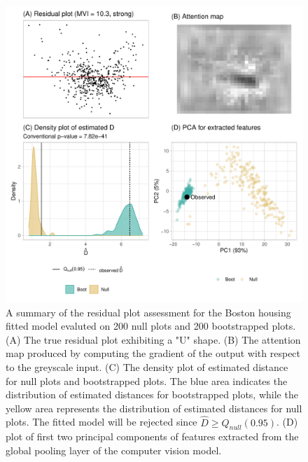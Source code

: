 \documentclass[]{interact}
\theoremstyle{plain}%
\theoremstyle{definition}
\theoremstyle{remark}
\begin{document}
\begin{figure}[!h]

{\centering \includegraphics[width=1\linewidth]{paper_files/figure-latex/boston-check-1} 

}

\caption{A summary of the residual plot assessment for the Boston housing fitted model evaluted on 200 null plots and 200 bootstrapped plots. (A) The true residual plot exhibiting a "U" shape. (B) The attention map produced by computing the gradient of the output with respect to the greyscale input.  (C) The density plot of estimated distance for null plots and bootstrapped plots. The blue area indicates the distribution of estimated distances for bootstrapped plots, while the yellow area represents the distribution of estimated distances for null plots. The fitted model will be rejected since $\hat{D} \geq Q_{null}(0.95)$. (D) plot of first two principal components of features extracted from the global pooling layer of the computer vision model. }\label{fig:boston-check}
\end{figure}
\end{document}
